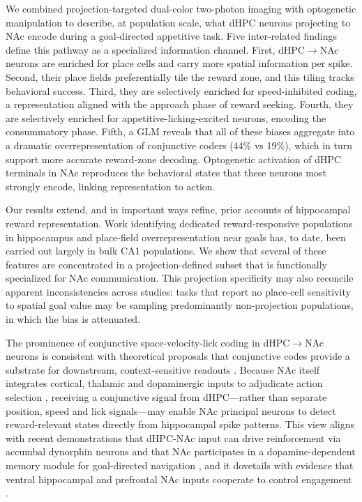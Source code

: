 \documentclass[11pt]{article}
\begin{document}
We combined projection-targeted dual-color two-photon imaging with optogenetic manipulation to describe, at population scale, what dHPC neurons projecting to NAc encode during a goal-directed appetitive task. Five inter-related findings define this pathway as a specialized information channel. First, dHPC$\rightarrow$NAc neurons are enriched for place cells and carry more spatial information per spike. Second, their place fields preferentially tile the reward zone, and this tiling tracks behavioral success. Third, they are selectively enriched for speed-inhibited coding, a representation aligned with the approach phase of reward seeking. Fourth, they are selectively enriched for appetitive-licking-excited neurons, encoding the consummatory phase. Fifth, a GLM reveals that all of these biases aggregate into a dramatic overrepresentation of conjunctive coders (44\% vs 19\%), which in turn support more accurate reward-zone decoding. Optogenetic activation of dHPC terminals in NAc reproduces the behavioral states that these neurons most strongly encode, linking representation to action.

Our results extend, and in important ways refine, prior accounts of hippocampal reward representation. Work identifying dedicated reward-responsive populations in hippocampus \citep{Gauthier2018Reward,Sosa2018Reward} and place-field overrepresentation near goals \citep{Hok2007Goal,Mamad2017PlaceField,Sato2020Overrepresentation,Kaufman2020LocusCoeruleus} has, to date, been carried out largely in bulk CA1 populations. We show that several of these features are concentrated in a projection-defined subset that is functionally specialized for NAc communication. This projection specificity may also reconcile apparent inconsistencies across studies: tasks that report no place-cell sensitivity to spatial goal value \citep{Duvelle2019PlaceCells} may be sampling predominantly non-projection populations, in which the bias is attenuated.

The prominence of conjunctive space-velocity-lick coding in dHPC$\rightarrow$NAc neurons is consistent with theoretical proposals that conjunctive codes provide a substrate for downstream, context-sensitive readouts \citep{Xiao2020Conjunctive}. Because NAc itself integrates cortical, thalamic and dopaminergic inputs to adjudicate action selection \citep{Mogenson1980Motivation,Britt2012Synaptic,Jung2024Dopamine}, receiving a conjunctive signal from dHPC---rather than separate position, speed and lick signals---may enable NAc principal neurons to detect reward-relevant states directly from hippocampal spike patterns. This view aligns with recent demonstrations that dHPC-NAc input can drive reinforcement via accumbal dynorphin neurons \citep{Ibrahim2024DorsalHPC} and that NAc participates in a dopamine-dependent memory module for goal-directed navigation \citep{Jung2024Dopamine}, and it dovetails with evidence that ventral hippocampal and prefrontal NAc inputs cooperate to control engagement \citep{Iyer2025Engagement}.
\end{document}
